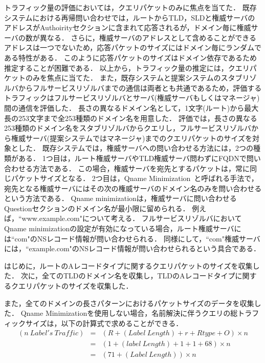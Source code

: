 トラフィック量の評価においては，クエリパケットのみに焦点を当てた．
既存システムにおける再帰問い合わせでは，ルートからTLD，SLDと権威サーバのアドレスがAuthoirityセクションに含まれて応答されるが，ドメイン毎に権威サーバの数が異なる．
さらに，権威サーバのアドレスとして含めることができるアドレスは一つでないため，応答パケットのサイズにはドメイン毎にランダムである特性がある．
このように応答パケットのサイズはドメイン依存であるため推定することが困難である．
以上から，トラフィック量の推定には，クエリパケットのみを焦点に当てた．
また，既存システムと提案システムのスタブリゾルバからフルサービスリゾルバまでの通信は両者とも共通であるため，評価するトラフィックはフルサービスリゾルバとサーバ(権威サーバもしくはマネージャ)間の通信を評価した．
長さの異なるドメイン名として，1文字(ルート)から最大長の253文字まで全253種類のドメイン名を用意した．
評価では，長さの異なる253種類のドメイン名をスタブリゾルバからクエリし，フルサービスリゾルバから権威サーバ(提案システムではマネージャ)までのクエリパケットのサイズを対象とした．
既存システムでは，権威サーバへの問い合わせる方法には，2つの種類がある．
1つ目は，ルート権威サーバやTLD権威サーバ問わずにFQDNで問い合わせる方法である．
この場合，権威サーバを宛先とするパケットは，常に同じパケットサイズとなる．
2つ目は，Qname Minimization~\cite{rfc7816}と呼ばれる手法で，宛先となる権威サーバにはその次の権威サーバのドメイン名のみを問い合わせるという方法である．
Qname minimizationは，権威サーバに問い合わせるQuestionセクションのドメイン名が最小限に留められる．
例えば，``www.example.com"について考える．
フルサービスリゾルバにおいてQname minimizationの設定が有効になっている場合，ルート権威サーバには``com"のNSレコード情報が問い合わせられる．
同様にして，``com"権威サーバには，``example.com"のNSレコード情報が問い合わせられるという具合である．

はじめに，ルートのAレコードタイプに関するクエリパケットのサイズを収集した．
次に，全てのTLDのドメイン名を収集し，TLDのAレコードタイプに関するクエリパケットのサイズを収集した．

また，全てのドメインの長さパターンにおけるパケットサイズのデータを収集した．
Qname Minimizationを使用しない場合，名前解決に伴うクエリの総トラフィックサイズは，以下の計算式で求めることができる．
\begin{eqnarray}
 (n\ Label's\ Traffic) &=& (R + (Label\ Length) + r + Rtype + O) \times n\\
 &=& (1 + (label\ Length) + 1 + 1 + 68) \times n\\
 &=& (71 + (Label\ Length)) \times n
\end{eqnarray}

